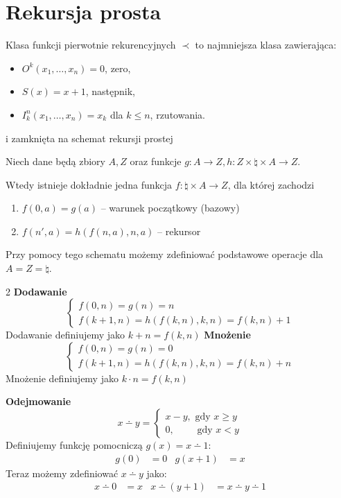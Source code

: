 \section{Rekursja prosta}
Klasa funkcji pierwotnie rekurencyjnych \(\prec\) to najmniejsza klasa zawierająca:
\begin{itemize}
\singlespacing
    \item \( O^k(x_1, \ldots, x_n) = 0\), zero,
    \item \( S(x) = x+1\), następnik,
    \item \( I^n_k(x_1, \ldots, x_n) = x_k\) dla \(k \leq n\), rzutowania.
\end{itemize}
i zamknięta na schemat rekursji prostej 



\begin{theorem}
    Niech dane będą zbiory \( A, Z \) oraz funkcje \( g: A \rightarrow Z, h : Z \times \natural \times A \rightarrow Z \).
    
    Wtedy istnieje dokładnie jedna funkcja \( f : \natural \times A \rightarrow Z \), dla której zachodzi
    \begin{enumerate}
        \item \( f(0, a) = g(a) \) -- warunek początkowy (bazowy)
        \item \( f(n', a) = h(f(n, a), n, a) \) -- rekursor
    \end{enumerate}
\end{theorem}

Przy pomocy tego schematu możemy zdefiniować podstawowe operacje dla \( A = Z = \natural \).

\begin{multicols}{2}
    \textbf{Dodawanie}
    \[
    \begin{cases}
        f(0, n) = g(n) = n \\
        f(k + 1, n) = h(f(k, n), k, n) = f(k, n) + 1
    \end{cases}
    \]
    Dodawanie definiujemy jako \( k + n = f(k, n) \)
\columnbreak\vfill
    \textbf{Mnożenie}
    \[
    \begin{cases}
        f(0, n) = g(n) = 0 \\
        f(k + 1, n) = h(f(k, n), k, n) = f(k, n) + n
    \end{cases}
    \]
    Mnożenie definiujemy jako \( k \cdot n = f(k, n) \)
\end{multicols}

\textbf{Odejmowanie}
\[
    x \dotminus y =
    \begin{cases}
        x - y, \text{ gdy } x \geq y \\
        0, \quad\quad \text{ gdy } x < y
    \end{cases}
\]
Definiujemy funkcję pomocniczą \(g(x) = x \dotminus 1\):
\begin{align*}
    g(0) & = 0 & g(x+1) & = x
\end{align*}
Teraz możemy zdefiniować \(x \dotminus y\) jako:
\begin{align*}
    x \dotminus 0 & = x & x \dotminus (y+1)& = x \dotminus y \dotminus 1
\end{align*}